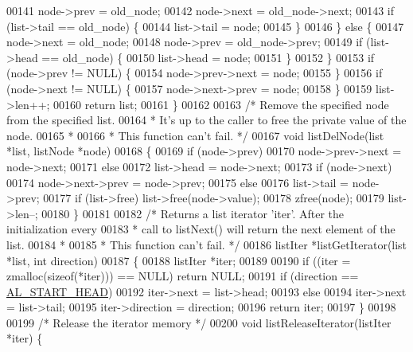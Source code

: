 \begin{DoxyCode}
00141         node->prev = old\_node;
00142         node->next = old\_node->next;
00143         \textcolor{keywordflow}{if} (list->tail == old\_node) \{
00144             list->tail = node;
00145         \}
00146     \} \textcolor{keywordflow}{else} \{
00147         node->next = old\_node;
00148         node->prev = old\_node->prev;
00149         \textcolor{keywordflow}{if} (list->head == old\_node) \{
00150             list->head = node;
00151         \}
00152     \}
00153     \textcolor{keywordflow}{if} (node->prev != NULL) \{
00154         node->prev->next = node;
00155     \}
00156     \textcolor{keywordflow}{if} (node->next != NULL) \{
00157         node->next->prev = node;
00158     \}
00159     list->len++;
00160     \textcolor{keywordflow}{return} list;
00161 \}
00162 
00163 \textcolor{comment}{/* Remove the specified node from the specified list.}
00164 \textcolor{comment}{ * It's up to the caller to free the private value of the node.}
00165 \textcolor{comment}{ *}
00166 \textcolor{comment}{ * This function can't fail. */}
00167 \textcolor{keywordtype}{void} listDelNode(list *list, listNode *node)
00168 \{
00169     \textcolor{keywordflow}{if} (node->prev)
00170         node->prev->next = node->next;
00171     \textcolor{keywordflow}{else}
00172         list->head = node->next;
00173     \textcolor{keywordflow}{if} (node->next)
00174         node->next->prev = node->prev;
00175     \textcolor{keywordflow}{else}
00176         list->tail = node->prev;
00177     \textcolor{keywordflow}{if} (list->free) list->free(node->value);
00178     zfree(node);
00179     list->len--;
00180 \}
00181 
00182 \textcolor{comment}{/* Returns a list iterator 'iter'. After the initialization every}
00183 \textcolor{comment}{ * call to listNext() will return the next element of the list.}
00184 \textcolor{comment}{ *}
00185 \textcolor{comment}{ * This function can't fail. */}
00186 listIter *listGetIterator(list *list, \textcolor{keywordtype}{int} direction)
00187 \{
00188     listIter *iter;
00189 
00190     \textcolor{keywordflow}{if} ((iter = zmalloc(\textcolor{keyword}{sizeof}(*iter))) == NULL) \textcolor{keywordflow}{return} NULL;
00191     \textcolor{keywordflow}{if} (direction == \hyperlink{adlist_8h_a353f032fdd7e66abe9f194fa7c89560b}{AL\_START\_HEAD})
00192         iter->next = list->head;
00193     \textcolor{keywordflow}{else}
00194         iter->next = list->tail;
00195     iter->direction = direction;
00196     \textcolor{keywordflow}{return} iter;
00197 \}
00198 
00199 \textcolor{comment}{/* Release the iterator memory */}
00200 \textcolor{keywordtype}{void} listReleaseIterator(listIter *iter) \{

\end{DoxyCode}
